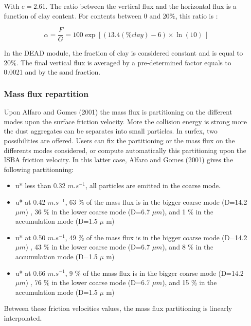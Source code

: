 With $c=2.61$. The ratio between the vertical flux and the horizontal flux is a function of clay content.
For contents between 0 and 20\%, this ratio is :

\begin{equation}
\alpha = \frac{F}{G} = 100 \exp { \left [  ( 13.4 (\%clay) - 6 ) \times \ln(10) ~\right ] }
\end{equation}

	
In the DEAD  module, the fraction of clay is considered constant and is equal to 20\%.
The final vertical flux is averaged by a pre-determined factor equals to 0.0021 and by the sand fraction.


\subsubsection{Mass flux repartition}
Upon Alfaro and Gomes (2001)\nocite{Alfaro2001} the mass flux is partitioning on the different modes upon  the surface friction velocity. More the
collision energy is strong more the dust aggregates can be separates into small particles.
In surfex, two possibilities are offered. Users can fix the partitioning or the mass flux on the differents modes considered, or compute automatically this partitioning upon the ISBA friction velocity.
In this latter case, Alfaro and Gomes (2001)\nocite{Alfaro2001} gives the following partitionning:
\begin{itemize}
\item u* less than 0.32 $m.s^{-1}$, all particles are emitted in the coarse mode.
\item u* at 0.42 $m.s^{-1}$,  63 \% of the mass flux is in the bigger coarse mode (D=14.2 $\mu m$) ,  36 \% in the lower coarse mode (D=6.7 $\mu m$), and 1 \% in the accumulation mode (D=1.5 $\mu$ m)
\item u* at 0.50 $m.s^{-1}$,  49 \% of the mass flux is in the bigger coarse mode (D=14.2 $\mu m$) ,  43 \% in the lower coarse mode (D=6.7 $\mu m$), and 8 \% in the accumulation mode (D=1.5 $\mu$ m)
\item u* at 0.66 $m.s^{-1}$,  9 \% of the mass flux is in the bigger coarse mode (D=14.2 $\mu m$) ,  76 \% in the lower coarse mode (D=6.7 $\mu m$), and 15 \% in the accumulation mode (D=1.5 $\mu$ m)
\end{itemize}
Between these friction velocities values, the mass flux partitioning is linearly interpolated.

